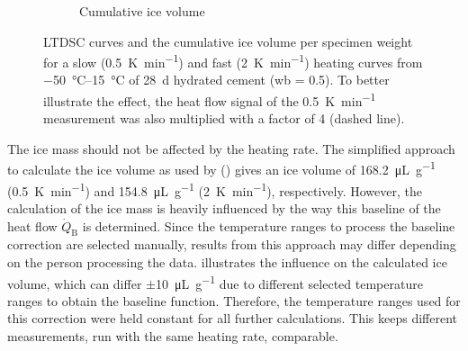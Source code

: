 \begin{figure}[!htb]
\begin{subfigure}{.485\textwidth}
	  \caption{Cumulative ice volume}
	  \label{fig:ltdsc_result_heating_rate_b}

	\end{subfigure}

    \caption{
		\ac{LTDSC} curves and the cumulative ice volume per specimen weight for a slow (\qty{0.5}{\kelvin\per\minute}) and fast (\qty{2}{\kelvin\per\minute}) heating curves from \qtyrange{-50}{15}{\celsius} of \qty{28}{\day} hydrated cement (\ac{wb} = \num{0.5}).
		To better illustrate the effect, the heat flow signal of the \qty{0.5}{\kelvin\per\minute} measurement was also multiplied with a factor of \num{4} (dashed line).
	}
    \label{fig:ltdsc_result_heating_rate}
\end{figure}

The ice mass should not be affected by the heating rate.
The simplified approach to calculate the ice volume as used by \textcite{mueller.2021} () gives an ice volume of \qty{168.2}{\micro\liter\per\gram} (\qty{0.5}{\kelvin\per\minute}) and \qty{154.8}{\micro\liter\per\gram} (\qty{2}{\kelvin\per\minute}), respectively.
However, the calculation of the ice mass is heavily influenced by the way this baseline of the heat flow $\dot{Q}_\text{B}$ is determined.
Since the temperature ranges to process the baseline correction are selected manually, results from this approach may differ depending on the person processing the data.
 illustrates the influence on the calculated ice volume, which can differ $\pm$\qty{10}{\micro\liter\per\gram} due to different selected temperature ranges to obtain the baseline function.
Therefore, the temperature ranges used for this correction were held constant for all further calculations.
This keeps different measurements, run with the same heating rate, comparable.

